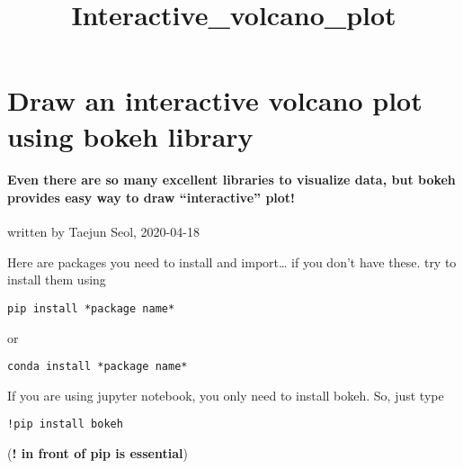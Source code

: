 \documentclass[11pt]{article}
\title{Interactive\_volcano\_plot}
\begin{document}
    
    
    \maketitle
    
    

    
    \hypertarget{draw-an-interactive-volcano-plot-using-bokeh-library}{%
\section{Draw an interactive volcano plot using bokeh
library}\label{draw-an-interactive-volcano-plot-using-bokeh-library}}

    \hypertarget{even-there-are-so-many-excellent-libraries-to-visualize-data-but-bokeh-provides-easy-way-to-draw-interactive-plot}{%
\paragraph{\texorpdfstring{Even there are so many excellent libraries to
visualize data, but bokeh provides easy way to draw
\textbf{``interactive''}
plot!}{Even there are so many excellent libraries to visualize data, but bokeh provides easy way to draw ``interactive'' plot!}}\label{even-there-are-so-many-excellent-libraries-to-visualize-data-but-bokeh-provides-easy-way-to-draw-interactive-plot}}

written by Taejun Seol, 2020-04-18

    Here are packages you need to install and import\ldots{} if you don't
have these. try to install them using

\begin{verbatim}
pip install *package name*
\end{verbatim}

or

\begin{verbatim}
conda install *package name*
\end{verbatim}

If you are using jupyter notebook, you only need to install bokeh. So,
just type

\begin{verbatim}
!pip install bokeh
\end{verbatim}

(\textbf{! in front of pip is essential})
\end{document}
